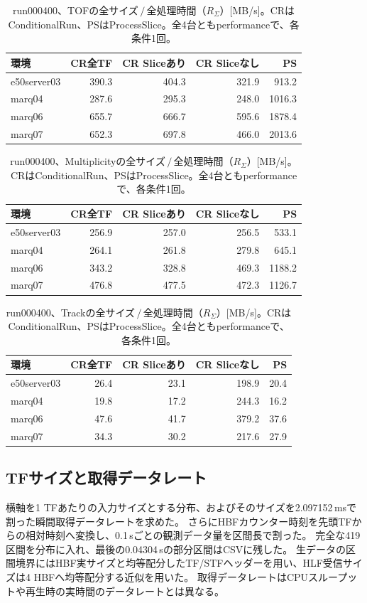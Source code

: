 \begin{table}[htbp]
 \centering
 \caption{run000400、TOFの全サイズ$\,/\,$全処理時間（$R_\Sigma$）[MB/s]。CRはConditionalRun、PSはProcessSlice。全4台ともperformanceで、各条件1回。}
 \begin{tabular}{lrrrr}\hline
 環境 & CR全TF & CR Sliceあり & CR Sliceなし & PS \\ \hline
 e50server03 & 390.3 & 404.3 & 321.9 & 913.2 \\
 marq04 & 287.6 & 295.3 & 248.0 & 1016.3 \\
 marq06 & 655.7 & 666.7 & 595.6 & 1878.4 \\
 marq07 & 652.3 & 697.8 & 466.0 & 2013.6 \\
 \hline\end{tabular}
\end{table}
\begin{table}[htbp]
 \centering
 \caption{run000400、Multiplicityの全サイズ$\,/\,$全処理時間（$R_\Sigma$）[MB/s]。CRはConditionalRun、PSはProcessSlice。全4台ともperformanceで、各条件1回。}
 \begin{tabular}{lrrrr}\hline
 環境 & CR全TF & CR Sliceあり & CR Sliceなし & PS \\ \hline
 e50server03 & 256.9 & 257.0 & 256.5 & 533.1 \\
 marq04 & 264.1 & 261.8 & 279.8 & 645.1 \\
 marq06 & 343.2 & 328.8 & 469.3 & 1188.2 \\
 marq07 & 476.8 & 477.5 & 472.3 & 1126.7 \\
 \hline\end{tabular}
\end{table}
\begin{table}[htbp]
 \centering
 \caption{run000400、Trackの全サイズ$\,/\,$全処理時間（$R_\Sigma$）[MB/s]。CRはConditionalRun、PSはProcessSlice。全4台ともperformanceで、各条件1回。}
 \begin{tabular}{lrrrr}\hline
 環境 & CR全TF & CR Sliceあり & CR Sliceなし & PS \\ \hline
 e50server03 & 26.4 & 23.1 & 198.9 & 20.4 \\
 marq04 & 19.8 & 17.2 & 244.3 & 16.2 \\
 marq06 & 47.6 & 41.7 & 379.2 & 37.6 \\
 marq07 & 34.3 & 30.2 & 217.6 & 27.9 \\
 \hline\end{tabular}
\end{table}
\subsection{TFサイズと取得データレート}
横軸を1 TFあたりの入力サイズとする分布、およびそのサイズを2.097152\,msで割った瞬間取得データレートを求めた。
さらにHBFカウンター時刻を先頭TFからの相対時刻へ変換し、0.1\,sごとの観測データ量を区間長で割った。
完全な419区間を分布に入れ、最後の0.04304\,sの部分区間はCSVに残した。
生データの区間境界にはHBF実サイズと均等配分したTF/STFヘッダーを用い、HLF受信サイズは4 HBFへ均等配分する近似を用いた。
取得データレートはCPUスループットや再生時の実時間のデータレートとは異なる。

